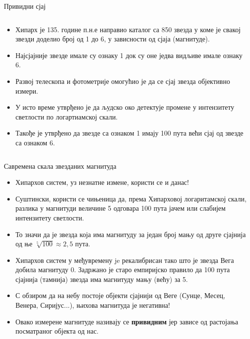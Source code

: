 \documentclass[aspectratio=169, xcolor=table, 10pt]{beamer}
\begin{document}
\begin{frame}{Привидни сјај}
\begin{columns}[T]
\begin{column}{0.65\textwidth}
\begin{itemize}
        \item Хипарх је 135. године п.н.е направио каталог са 850 звезда у коме је свакој звезди доделио број од 1 до 6, у зависности од сјаја (магнитуде).
        \item Најсјајније звезде имале су ознаку 1 док су оне једва видљиве имале ознаку 6.
        \item Развој телескопа и фотометрије омогућио је да се сјај звезда објективно измери.
        \item У исто време утврђено је да људско око детектује промене у интензитету светлости по логартиамској скали.
        \item Такође је утврђено да звезде са ознаком 1 имају 100 пута већи сјај од звезде са ознаком 6.
      \end{itemize}
    \end{column}
  \end{columns}
\end{frame}

\begin{frame}{Савремена скала звезданих магнитуда}
  \begin{itemize}
    \item Хипархов систем, уз незнатне измене, користи се и данас!
    \item Суштински, користи се чињеница да, према Хипарховој логаритамској скали, разлика у магнитуди величине 5 одговара 100 пута јачем или слабијем интензитету светлости.
    \item То значи да је звезда која има магнитуду за један број мању од друге сјајнија од ње $\sqrt[5]{100}\approx2,5$ пута.
    \item Хипархов систем у међувремену je рекалибрисан тако што је звезда Вега добила магнитуду 0. Задржано је старо емпиријско правило да 100 пута сјајнија (тамнија) звезда има магнитуду мању (већу) за 5.
    \item С обзиром да на небу постоје објекти сјајнији од Веге (Сунце, Месец, Венера, Сиријус...), њихова магнитуда је негативна!
    \item Овако измерене магнитуде називају се \textbf{привидним} јер зависе од растојања посматраног објекта од нас.
  \end{itemize}
\end{frame}
\end{document}
